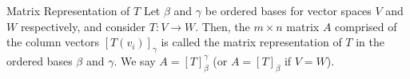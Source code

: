 \documentclass{exam}
\begin{document}
    \begin{defbox}{Matrix Representation of $T$}{}
        Let $\beta$ and $\gamma$ be ordered bases for vector spaces $V$ and $W$ respectively, and consider $T: V \to W$. Then, the $m \times n$ matrix $A$ comprised of the column vectors $[T(v_i)]_\gamma$ is called the matrix representation of $T$ in the ordered bases $\beta$ and $\gamma$. We say $A = [T]_\beta^\gamma$ (or $A = [T]_\beta$ if $V = W$).
    \end{defbox}
\end{document}
